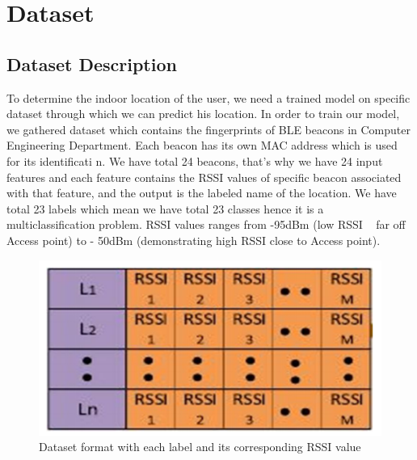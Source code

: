 
\chapter{Dataset} %
\label{Chapter3}

\section {Dataset Description}
To determine the indoor location of the user, we need a trained model on specific dataset  through which we can predict his location. In order to train our model, we gathered dataset which contains the fingerprints of BLE beacons in Computer Engineering Department. Each beacon has its own MAC address which is used for its identificati n. We have total 24 beacons, that’s why we have 24 input features and each feature contains the RSSI values of specific beacon associated with that feature, and the output is the labeled name of the location. We have total 23 labels which mean we have total 23 classes hence it is a multiclassification problem. RSSI values ranges from -95dBm (low RSSI ~ far off Access point) to - 50dBm (demonstrating high RSSI close to Access point).
\begin{figure}[h]
  		\centering
    		\includegraphics{./Figures/1}
\caption{Dataset format with each label and its corresponding RSSI value}
\label{fig:1}
 		\end{figure}
    

